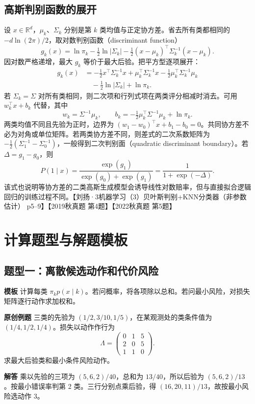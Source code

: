 \documentclass[UTF8,a4paper,zihao=-4,fontset=fandol]{ctexrep}
\begin{document}
\subsection*{高斯判别函数的展开}
设 $x\in\mathbb R^d$，$\mu_k$、$\Sigma_k$ 分别是第 $k$ 类均值与正定协方差。省去所有类都相同的 $-d\ln(2\pi)/2$，取对数判别函数（discriminant function）
\[
 g_k(x)=\ln\pi_k-\tfrac12\ln|\Sigma_k|
        -\tfrac12(x-\mu_k)^\top\Sigma_k^{-1}(x-\mu_k).
\]
因对数严格递增，最大 $g_k$ 等价于最大后验。把平方型逐项展开：
\begin{align*}
 g_k(x)
 &=-\tfrac12 x^\top\Sigma_k^{-1}x
   +\mu_k^\top\Sigma_k^{-1}x
   -\tfrac12\mu_k^\top\Sigma_k^{-1}\mu_k\\
 &\quad-\tfrac12\ln|\Sigma_k|+\ln\pi_k .
\end{align*}
若 $\Sigma_k=\Sigma$ 对所有类相同，则二次项和行列式项在两类评分相减时消去。可用 $w_k^\top x+b_k$ 代替，其中
\[
 w_k=\Sigma^{-1}\mu_k,\qquad
 b_k=-\tfrac12\mu_k^\top\Sigma^{-1}\mu_k+\ln\pi_k.
\]
两类均值不同且先验为正时，边界为 $(w_1-w_0)^\top x+b_1-b_0=0$。共同协方差不必为对角或单位矩阵。若两类协方差不同，则差式的二次系数矩阵为 $-\tfrac12(\Sigma_1^{-1}-\Sigma_0^{-1})$，一般得到二次判别面（quadratic discriminant boundary）。若 $\Delta=g_1-g_0$，则
\[
 P(1\mid x)=\frac{\exp(g_1)}{\exp(g_0)+\exp(g_1)}
           =\frac{1}{1+\exp(-\Delta)}.
\]
该式也说明等协方差的二类高斯生成模型会诱导线性对数赔率，但与直接拟合逻辑回归的训练过程不同。【刘扬·3机器学习（3）贝叶斯判别+KNN分类器（非参数估计） p5–9】【2019秋真题 第4题】【2022秋真题 第5题】

\section{计算题型与解题模板}
\subsection*{题型一：离散候选动作和代价风险}
\textbf{模板} 计算每类 $\pi_kp(x\mid k)$。若问概率，将各项除以总和。若问最小风险，对损失矩阵逐行动作求加权和。

\textbf{原创例题} 三类的先验为 $(1/2,3/10,1/5)$，在某观测处的类条件值为 $(1/4,1/2,1/4)$。损失以动作作行为
\[
 \Lambda=\begin{pmatrix}0&1&5\\2&0&5\\1&1&0\end{pmatrix}.
\]
求最大后验类和最小条件风险动作。

\textbf{解答} 乘以先验的三项为 $(5,6,2)/40$，总和为 $13/40$，所以后验为 $(5,6,2)/13$。按最小错误率判第 2 类。三行分别点乘后验，得 $(16,20,11)/13$，故按最小风险选动作 3。
\end{document}
